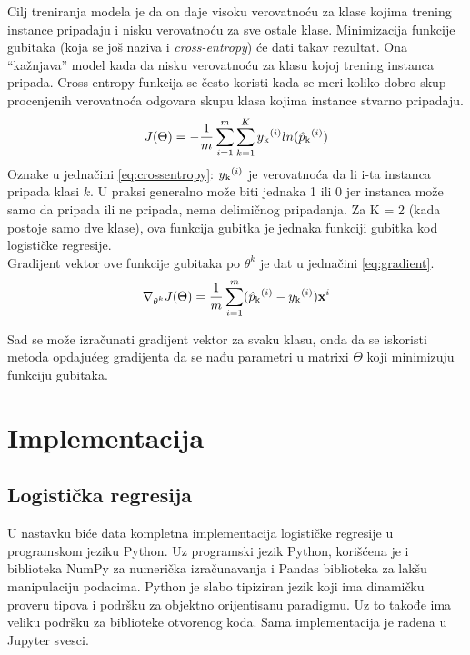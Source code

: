 \documentclass[a4paper,12pt]{report}
\begin{document}
Cilj treniranja modela je da on daje visoku verovatnoću za klase kojima trening instance pripadaju i nisku verovatnoću za sve ostale klase. Minimizacija funkcije gubitaka (koja se još naziva i \textit{cross-entropy}) će dati takav rezultat. Ona \enquote{kažnjava} model kada da nisku verovatnoću za klasu kojoj trening instanca pripada. Cross-entropy funkcija se često koristi kada se meri koliko dobro skup procenjenih verovatnoća odgovara skupu klasa kojima instance stvarno pripadaju. 
\begin{equation}\label{eq:crossentropy}
	J(\Theta) = - \frac{1}{m}\sum_{i = 1}^{m}\sum_{k = 1}^{K} y\textsubscript{k}^{(i)} ln(\hat{p}\textsubscript{k}^{(i)})
\end{equation}
Oznake u jednačini \ref{eq:crossentropy}: $y\textsubscript{k}^{(i)}$ je verovatnoća da li i-ta instanca pripada klasi $k$. 
U praksi generalno može biti jednaka 1 ili 0 jer instanca može samo da pripada ili ne pripada, nema delimičnog pripadanja. Za K = 2 (kada postoje samo dve klase), ova funkcija gubitka je jednaka funkciji gubitka kod logističke regresije. \\

Gradijent vektor ove funkcije gubitaka po $\theta^{k}$ je dat u jednačini \ref{eq:gradient}. 
\begin{equation} \label{eq:gradient}
	\nabla\textsubscript{$\theta^{k}$}   J(\Theta) = \frac{1}{m}\sum_{i = 1}^{m} (\hat{p}\textsubscript{k}^{(i)} - y\textsubscript{k}^{(i)})\textbf{x}^{i}
\end{equation}

Sad se može izračunati gradijent vektor za svaku klasu, onda da se iskoristi metoda opdajućeg gradijenta da se nađu parametri u matrixi $\Theta$ koji minimizuju funkciju gubitaka. 
\chapter{Implementacija}

\section{Logistička regresija}

U nastavku biće data kompletna implementacija logističke regresije u programskom jeziku Python. Uz programski jezik Python, korišćena je i biblioteka NumPy za numerička izračunavanja i Pandas biblioteka za lakšu manipulaciju podacima. Python je slabo tipiziran jezik koji ima dinamičku proveru tipova i podršku za objektno orijentisanu paradigmu. Uz to takođe ima veliku podršku za biblioteke otvorenog koda. Sama implementacija je rađena u Jupyter svesci.\\ 
\end{document}

